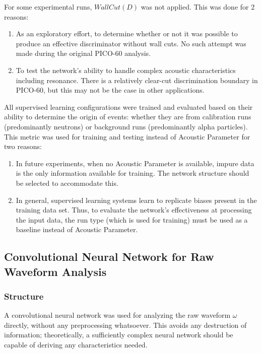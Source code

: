 \documentclass[10pt]{article}
\begin{document}
For some experimental runs, $WallCut(D)$ was not applied. This was done for 2 reasons:

\begin{enumerate}
    \item As an exploratory effort, to determine whether or not it was possible to produce an effective discriminator without wall cuts. No such attempt was made during the original PICO-60 analysis.
    \item To test the network's ability to handle complex acoustic characteristics including resonance. There is a relatively clear-cut discrimination boundary in PICO-60, but this may not be the case in other applications.
\end{enumerate}

All supervised learning configurations were trained and evaluated based on their ability to determine the origin of events: whether they are from calibration runs (predominantly neutrons) or background runs (predominantly alpha particles). This metric was used for training and testing instead of Acoustic Parameter for two reasons:

\begin{enumerate}
    \item In future experiments, when no Acoustic Parameter is available, impure data is the only information available for training. The network structure should be selected to accommodate this.
    \item In general, supervised learning systems learn to replicate biases present in the training data set. Thus, to evaluate the network's effectiveness at processing the input data, the run type (which is used for training) must be used as a baseline instead of Acoustic Parameter.
\end{enumerate}

\subsection{Convolutional Neural Network for Raw Waveform Analysis}

\subsubsection{Structure}

A convolutional neural network was used for analyzing the raw waveform $\omega$ directly, without any preprocessing whatsoever. This avoids any destruction of information; theoretically, a sufficiently complex neural network should be capable of deriving any characteristics needed.
\end{document}
